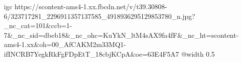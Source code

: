  
 
 
 
 

\qqSecCmt


\ifcmt
  igc https://scontent-ams4-1.xx.fbcdn.net/v/t39.30808-6/323717281_2296911357137585_4918936295129853780_n.jpg?_nc_cat=101&ccb=1-7&_nc_sid=dbeb18&_nc_ohc=KuYkN_ltM4sAX9fa4fF&_nc_ht=scontent-ams4-1.xx&oh=00_AfCAKM2m33MQ1-ifINCRB7YegkRkFgFDpEtT_18cbjKCpA&oe=63E4F5A7
  @width 0.5
\fi

